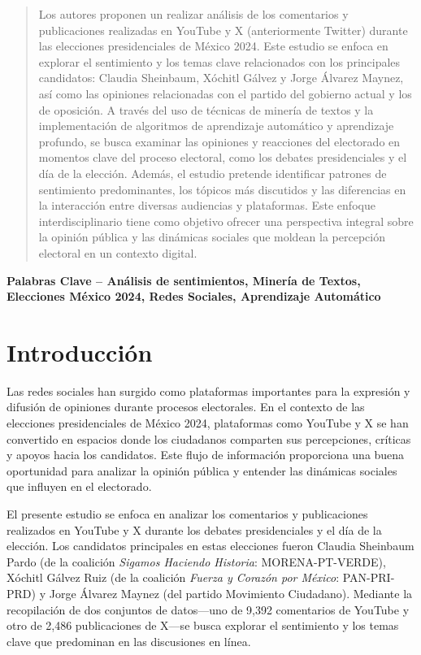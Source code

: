 \documentclass[10pt, a4paper]{article}
\begin{document}
	\newpage
	\maketitle
	\thispagestyle{fancy}
	\begin{abstract}
		Los autores proponen un realizar análisis de los comentarios y publicaciones realizadas en YouTube y X (anteriormente Twitter) durante las elecciones presidenciales de México 2024. Este estudio se enfoca en explorar el sentimiento y los temas clave relacionados con los principales candidatos: Claudia Sheinbaum, Xóchitl Gálvez y Jorge Álvarez Maynez, así como las opiniones relacionadas con el partido del gobierno actual y los de oposición. A través del uso de técnicas de minería de textos y la implementación de algoritmos de aprendizaje automático y aprendizaje profundo, se busca examinar las opiniones y reacciones del electorado en momentos clave del proceso electoral, como los debates presidenciales y el día de la elección. Además, el estudio pretende identificar patrones de sentimiento predominantes, los tópicos más discutidos y las diferencias en la interacción entre diversas audiencias y plataformas. Este enfoque interdisciplinario tiene como objetivo ofrecer una perspectiva integral sobre la opinión pública y las dinámicas sociales que moldean la percepción electoral en un contexto digital.
	\end{abstract}
	
	\textbf{Palabras Clave -- Análisis de sentimientos, Minería de Textos, Elecciones México 2024, Redes Sociales, Aprendizaje Automático}{\mykeywords}
	
	\section{Introducción}
	Las redes sociales han surgido como plataformas importantes para la expresión y difusión de opiniones durante procesos electorales. En el contexto de las elecciones presidenciales de México 2024, plataformas como YouTube y X se han convertido en espacios donde los ciudadanos comparten sus percepciones, críticas y apoyos hacia los candidatos. Este flujo de información proporciona una buena oportunidad para analizar la opinión pública y entender las dinámicas sociales que influyen en el electorado.
	
	El presente estudio se enfoca en analizar los comentarios y publicaciones realizados en YouTube y X durante los debates presidenciales y el día de la elección. Los candidatos principales en estas elecciones fueron Claudia Sheinbaum Pardo (de la coalición \textit{Sigamos Haciendo Historia}: MORENA-PT-VERDE), Xóchitl Gálvez Ruiz (de la coalición \textit{Fuerza y Corazón por México}: PAN-PRI-PRD) y Jorge Álvarez Maynez (del partido Movimiento Ciudadano). Mediante la recopilación de dos conjuntos de datos—uno de 9,392 comentarios de YouTube y otro de 2,486 publicaciones de X—se busca explorar el sentimiento y los temas clave que predominan en las discusiones en línea.
	
\end{document}
